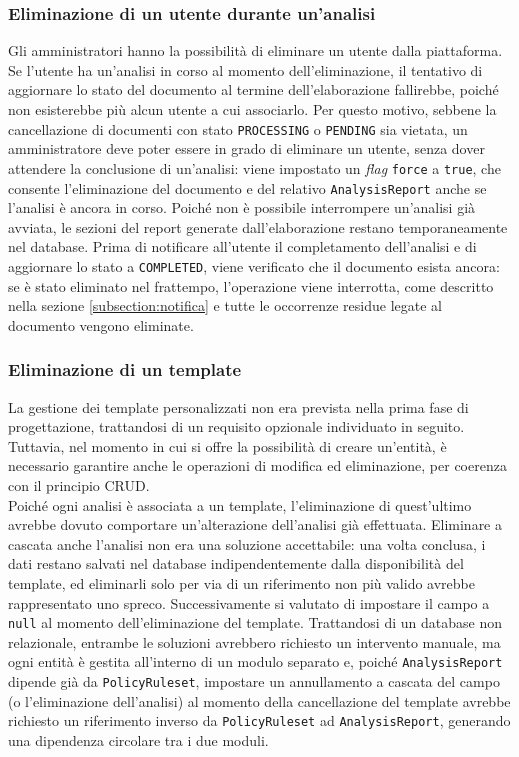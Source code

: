 \subsubsection{Eliminazione di un utente durante un'analisi}
Gli amministratori hanno la possibilità di eliminare un utente dalla piattaforma. Se l'utente ha un'analisi in corso al momento dell'eliminazione, il tentativo di aggiornare lo stato del documento al termine dell'elaborazione fallirebbe, poiché non esisterebbe più alcun utente a cui associarlo. Per questo motivo, sebbene la cancellazione di documenti con stato \texttt{PROCESSING} o \texttt{PENDING} sia vietata, un amministratore deve poter essere in grado di eliminare un utente, senza dover attendere la conclusione di un'analisi: viene impostato un \emph{flag} \texttt{force} a \texttt{true}, che consente l'eliminazione del documento e del relativo \texttt{AnalysisReport} anche se l'analisi è ancora in corso. Poiché non è possibile interrompere un'analisi già avviata, le sezioni del report generate dall'elaborazione restano temporaneamente nel database. Prima di notificare all'utente il completamento dell'analisi e di aggiornare lo stato a \texttt{COMPLETED}, viene verificato che il documento esista ancora: se è stato eliminato nel frattempo, l'operazione viene interrotta, come descritto nella sezione \ref{subsection:notifica} e tutte le occorrenze residue legate al documento vengono eliminate.\\

\subsubsection{Eliminazione di un template}
La gestione dei template personalizzati non era prevista nella prima fase di progettazione, trattandosi di un requisito opzionale individuato in seguito. Tuttavia, nel momento in cui si offre la possibilità di creare un'entità, è necessario garantire anche le operazioni di modifica ed eliminazione, per coerenza con il principio CRUD.\\

Poiché ogni analisi è associata a un template, l'eliminazione di quest'ultimo avrebbe dovuto comportare un'alterazione dell'analisi già effettuata. Eliminare a cascata anche l'analisi non era una soluzione accettabile: una volta conclusa, i dati restano salvati nel database indipendentemente dalla disponibilità del template, ed eliminarli solo per via di un riferimento non più valido avrebbe rappresentato uno spreco. Successivamente si valutato di impostare il campo a \texttt{null} al momento dell'eliminazione del template. Trattandosi di un database non relazionale, entrambe le soluzioni avrebbero richiesto un intervento manuale, ma ogni entità è gestita all'interno di un modulo separato e, poiché \texttt{AnalysisReport} dipende già da \texttt{PolicyRuleset}, impostare un annullamento a cascata del campo (o l'eliminazione dell'analisi) al momento della cancellazione del template avrebbe richiesto un riferimento inverso da \texttt{PolicyRuleset} ad \texttt{AnalysisReport}, generando una dipendenza circolare tra i due moduli.\\

